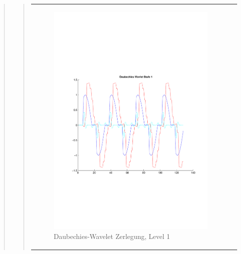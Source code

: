 \begin{quote}
\begin{quote}
\begin{center}
\begin{tabular}{ll}
\begin{minipage}{0.6\textwidth}
                        \begin{figure}[H]
                            \label{fig:}
                            \includegraphics[scale=0.45, trim = 0.8cm 6cm 3cm
                            7.5cm,
                            clip]{./Bilder/Termin8/Daubechies_Wavlet_lvl_1}
                            \caption{Daubechies-Wavelet Zerlegung, Level 1}
                        \end{figure}
                    \vspace{-1.5em}
    
                    \end{minipage}
    
                \end{tabular}
                \end{center}
                

\end{quote}
\end{quote}
